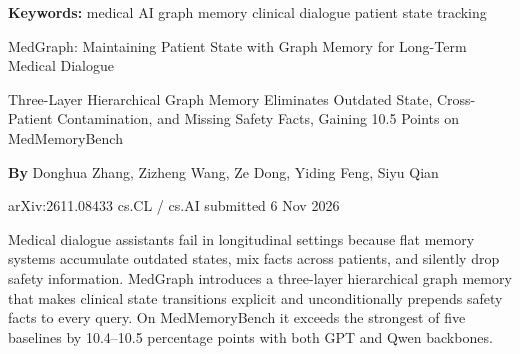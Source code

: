 \documentclass[10pt,twocolumn]{article}
\begin{document}
\setlength{\parindent}{0pt}
\setlength{\parskip}{4pt}

{\small\color{keywordgray}\textbf{Keywords:}
  medical AI \textbullet{}
  graph memory \textbullet{}
  clinical dialogue \textbullet{}
  patient state tracking}\par\vspace{4pt}

{\LARGE\bfseries\raggedright
  MedGraph: Maintaining Patient State with Graph Memory
  for Long-Term Medical Dialogue}\par\vspace{4pt}

{\large\itshape\raggedright
  Three-Layer Hierarchical Graph Memory Eliminates Outdated State,
  Cross-Patient Contamination, and Missing Safety Facts, Gaining
  10.5 Points on MedMemoryBench}\par\vspace{6pt}

{\small\textbf{By} Donghua Zhang, Zizheng Wang, Ze Dong, Yiding Feng,
  Siyu Qian}\par\vspace{2pt}

{\small\color{keywordgray}arXiv:2611.08433 \textbullet{}
  cs.CL / cs.AI \textbullet{} submitted 6 Nov 2026}
\par\vspace{2pt}\noindent{\color{rulered}\rule{\columnwidth}{0.6pt}}\vspace{6pt}

Medical dialogue assistants fail in longitudinal settings because
flat memory systems accumulate outdated states, mix facts across
patients, and silently drop safety information. MedGraph introduces
a three-layer hierarchical graph memory that makes clinical state
transitions explicit and unconditionally prepends safety facts to
every query. On MedMemoryBench it exceeds the strongest of five
baselines by 10.4--10.5 percentage points with both GPT and Qwen
backbones.
\end{document}

